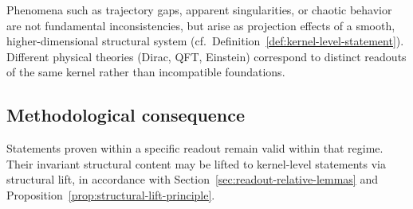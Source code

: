 Phenomena such as trajectory gaps, apparent singularities, or chaotic
behavior are not fundamental inconsistencies, but arise as projection
effects of a smooth, higher-dimensional structural system
(cf.\ Definition~\ref{def:kernel-level-statement}). Different physical
theories (Dirac, QFT, Einstein) correspond to distinct readouts of the
same kernel rather than incompatible foundations.

\subsection*{Methodological consequence}

Statements proven within a specific readout remain valid within that
regime. Their invariant structural content may be lifted to kernel-level
statements via structural lift, in accordance with
Section~\ref{sec:readout-relative-lemmas} and
Proposition~\ref{prop:structural-lift-principle}.


